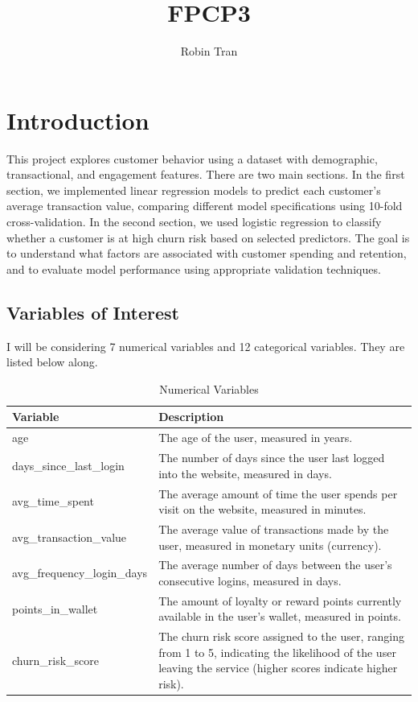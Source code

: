 \documentclass[
  letterpaper,
  DIV=11,
  numbers=noendperiod]{scrartcl}
\title{FPCP3}
\author{Robin Tran}
\date{}
\begin{document}
\maketitle


\section{Introduction}\label{introduction}

This project explores customer behavior using a dataset with
demographic, transactional, and engagement features. There are two main
sections. In the first section, we implemented linear regression models
to predict each customer's average transaction value, comparing
different model specifications using 10-fold cross-validation. In the
second section, we used logistic regression to classify whether a
customer is at high churn risk based on selected predictors. The goal is
to understand what factors are associated with customer spending and
retention, and to evaluate model performance using appropriate
validation techniques.

\subsection{Variables of Interest}\label{variables-of-interest}

I will be considering 7 numerical variables and 12 categorical
variables. They are listed below along.

\begin{table}[!h]

\caption{Numerical Variables}
\centering
\fontsize{10}{12}\selectfont
\begin{tabular}[t]{l>{\raggedright\arraybackslash}p{10cm}}
\toprule
Variable & Description\\
\midrule
age & The age of the user, measured in years.\\
days\_since\_last\_login & The number of days since the user last logged into the website, measured in days.\\
avg\_time\_spent & The average amount of time the user spends per visit on the website, measured in minutes.\\
avg\_transaction\_value & The average value of transactions made by the user, measured in monetary units (currency).\\
avg\_frequency\_login\_days & The average number of days between the user's consecutive logins, measured in days.\\
points\_in\_wallet & The amount of loyalty or reward points currently available in the user's wallet, measured in points.\\
churn\_risk\_score & The churn risk score assigned to the user, ranging from 1 to 5, indicating the likelihood of the user leaving the service (higher scores indicate higher risk).\\
\bottomrule
\end{tabular}
\end{table}
\end{document}
